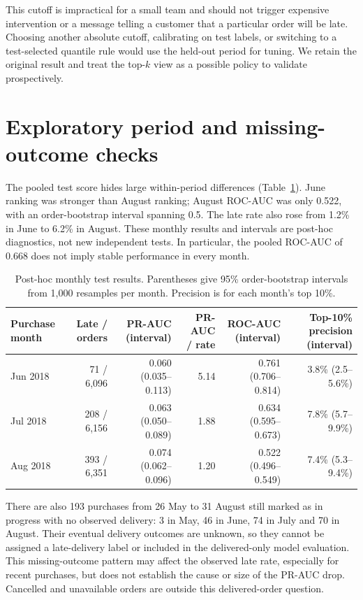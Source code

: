 \documentclass[11pt,a4paper]{article}
\begin{document}
This cutoff is impractical for a small team and should not trigger expensive intervention or a message telling a customer that a particular order will be late. Choosing another absolute cutoff, calibrating on test labels, or switching to a test-selected quantile rule would use the held-out period for tuning. We retain the original result and treat the top-$k$ view as a possible policy to validate prospectively.

\section*{Exploratory period and missing-outcome checks}
The pooled test score hides large within-period differences (Table~\ref{tab:months}). June ranking was stronger than August ranking; August ROC-AUC was only 0.522, with an order-bootstrap interval spanning 0.5. The late rate also rose from 1.2\% in June to 6.2\% in August. These monthly results and intervals are post-hoc diagnostics, not new independent tests. In particular, the pooled ROC-AUC of 0.668 does not imply stable performance in every month.

\begin{table}[h]
\centering\scriptsize
\caption{Post-hoc monthly test results. Parentheses give 95\% order-bootstrap intervals from 1,000 resamples per month. Precision is for each month's top 10\%.}
\label{tab:months}
\begin{tabular}{@{}lrrrrr@{}}
\toprule
Purchase month & Late / orders & PR-AUC (interval) & PR-AUC / rate & ROC-AUC (interval) & Top-10\% precision (interval) \\
\midrule
Jun 2018 & 71 / 6,096 & 0.060 (0.035--0.113) & 5.14 & 0.761 (0.706--0.814) & 3.8\% (2.5--5.6\%) \\
Jul 2018 & 208 / 6,156 & 0.063 (0.050--0.089) & 1.88 & 0.634 (0.595--0.673) & 7.8\% (5.7--9.9\%) \\
Aug 2018 & 393 / 6,351 & 0.074 (0.062--0.096) & 1.20 & 0.522 (0.496--0.549) & 7.4\% (5.3--9.4\%) \\
\bottomrule
\end{tabular}
\end{table}

There are also 193 purchases from 26 May to 31 August still marked as in progress with no observed delivery: 3 in May, 46 in June, 74 in July and 70 in August. Their eventual delivery outcomes are unknown, so they cannot be assigned a late-delivery label or included in the delivered-only model evaluation. This missing-outcome pattern may affect the observed late rate, especially for recent purchases, but does not establish the cause or size of the PR-AUC drop. Cancelled and unavailable orders are outside this delivered-order question.
\end{document}
